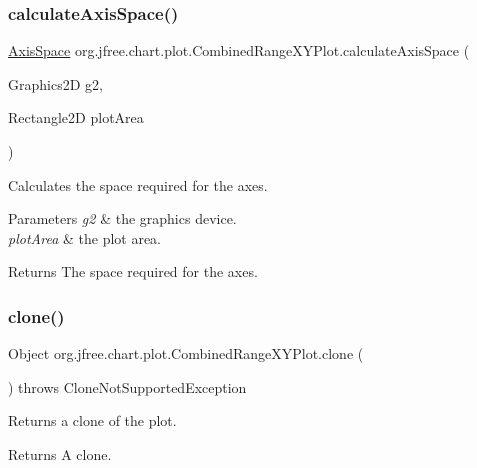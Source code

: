 \subsubsection{\texorpdfstring{calculate\+Axis\+Space()}{calculateAxisSpace()}}
{\footnotesize\ttfamily \mbox{\hyperlink{classorg_1_1jfree_1_1chart_1_1axis_1_1_axis_space}{Axis\+Space}} org.\+jfree.\+chart.\+plot.\+Combined\+Range\+X\+Y\+Plot.\+calculate\+Axis\+Space (\begin{DoxyParamCaption}\item[{Graphics2D}]{g2,  }\item[{Rectangle2D}]{plot\+Area }\end{DoxyParamCaption})\hspace{0.3cm}{\ttfamily [protected]}}

Calculates the space required for the axes.


\begin{DoxyParams}{Parameters}
{\em g2} & the graphics device. \\
\hline
{\em plot\+Area} & the plot area.\\
\hline
\end{DoxyParams}
\begin{DoxyReturn}{Returns}
The space required for the axes. 
\end{DoxyReturn}
\mbox{\label{classorg_1_1jfree_1_1chart_1_1plot_1_1_combined_range_x_y_plot_a7b0db791d2a0d2d5f303e0a614d1cadf}} 
\subsubsection{\texorpdfstring{clone()}{clone()}}
{\footnotesize\ttfamily Object org.\+jfree.\+chart.\+plot.\+Combined\+Range\+X\+Y\+Plot.\+clone (\begin{DoxyParamCaption}{ }\end{DoxyParamCaption}) throws Clone\+Not\+Supported\+Exception}

Returns a clone of the plot.

\begin{DoxyReturn}{Returns}
A clone.
\end{DoxyReturn}

